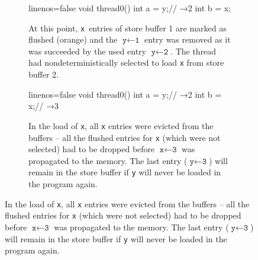 \begin{figure}[tp]
\begin{subfigure}[t]{0.3\textwidth}
\begin{cppcode*}{linenos=false}
  void thread0() {
    int a = y;// →2
    int b = x;
  }
\end{cppcode*}
\caption{At this point, \texttt{x}~entries of store buffer 1 are marked as flushed (\textcolor{flushed}{orange}) and the \mbox{$\texttt{y} \leftarrow \texttt{1}$} entry was removed as it was succeeded by the used entry \mbox{$\texttt{y} \leftarrow \texttt{2}$}.
The thread had nondeterministically selected to load \texttt{x} from store buffer 2.
}\label{fig:mm:flushflagB}

\end{subfigure}
%
\hfill
%
\begin{subfigure}[t]{0.3\textwidth}
\begin{cppcode*}{linenos=false}
  void thread0() {
    int a = y;// →2
    int b = x;// →3
  }
\end{cppcode*}
\caption{
In the load of \texttt{x}, all \texttt{x} entries were evicted from the buffers -- all the flushed entries for \texttt{x} (which were not selected) had to be dropped before \mbox{$\texttt{x} \leftarrow \texttt{3}$} was propagated to the memory.
The last entry (\mbox{$\texttt{y} \leftarrow \texttt{3}$}) will remain in the store buffer if \texttt{y} will never be loaded in the program again.
}\label{fig:mm:flushflagC}

\end{subfigure}
\end{figure}

